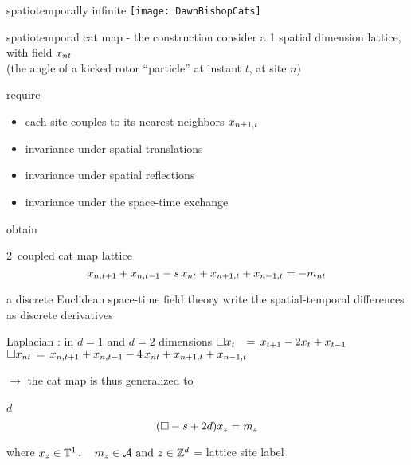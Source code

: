 \begin{frame}{spatiotemporally infinite \catlatt}
\hfill\texttt{[image: DawnBishopCats]}
\end{frame}

\begin{frame}{spatiotemporal cat map - the construction}
consider
a 1 spatial dimension lattice, with field
$x_{nt}$ \\
(the angle of a kicked
rotor ``particle'' at instant $t$, at site $n$)
\begin{block}{require}
\begin{itemize}
\item  each site couples to
its nearest neighbors $x_{n\pm1,t}$
\item  invariance under
spatial translations
\item  invariance under spatial reflections
\item  invariance under the space-time exchange
\end{itemize}
\end{block}

\bigskip

obtain
\begin{block}{2\dmn\ coupled cat map lattice}
\[
x_{n,t+1} + x_{n,t-1} - s \, x_{n t} + x_{n+1,t} + x_{n-1, t}
     =-{m_{n t}}
\] %
\end{block}
\end{frame}

\begin{frame}{a discrete Euclidean space-time field theory}
write the spatial-temporal differences as discrete derivatives
\begin{block}{Laplacian : in $d=1$ and $d=2$ dimensions}
\(
\Box x_t \;\;\,=\, x_{t+1} - 2x_{t} + x_{t-1}
\)\\ \(
\Box x_{nt} \,=\, x_{n,t+1} + x_{n,t-1}
- 4 \, x_{nt} + x_{n+1,t} + x_{n-1, t}
\)
\end{block}

\medskip

$\to$ the cat map is thus generalized  to
\begin{block}{$d$\dmn\ \catlatt}
\[
 (\Box -s+2d)x_{z} = m_z
\] %

\medskip

\end{block}

\bigskip

where
\(
  x_{z} \in  \mathbb{T}^{1}
    \,, \quad
  {\ensuremath{m_{z}}} \in \mathcal{A}
    \mbox{  and  }
  z\in \mathbb{Z}^{d}
\) = lattice site label
\end{frame}

